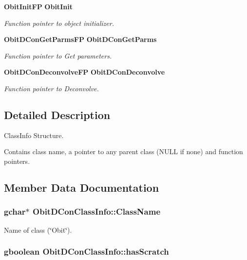 \begin{CompactItemize}
{\bf Obit\-Init\-FP} {\bf Obit\-Init}
\begin{CompactList}\small\item\em Function pointer to object initializer. \item\end{CompactList}\item 
{\bf Obit\-DCon\-Get\-Parms\-FP} {\bf Obit\-DCon\-Get\-Parms}
\begin{CompactList}\small\item\em Function pointer to Get parameters. \item\end{CompactList}\item 
{\bf Obit\-DCon\-Deconvolve\-FP} {\bf Obit\-DCon\-Deconvolve}
\begin{CompactList}\small\item\em Function pointer to Deconvolve. \item\end{CompactList}\end{CompactItemize}


\subsection{Detailed Description}
Class\-Info Structure. 

Contains class name, a pointer to any parent class (NULL if none) and function pointers. 



\subsection{Member Data Documentation}
\subsubsection{\setlength{\rightskip}{0pt plus 5cm}gchar$\ast$ {\bf Obit\-DCon\-Class\-Info::Class\-Name}}\label{structObitDConClassInfo_o2}


Name of class (\char`\"{}Obit\char`\"{}). 

\subsubsection{\setlength{\rightskip}{0pt plus 5cm}gboolean {\bf Obit\-DCon\-Class\-Info::has\-Scratch}}\label{structObitDConClassInfo_o1}


